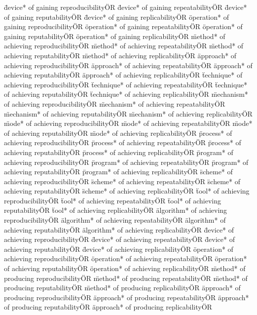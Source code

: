 \documentclass[
10pt, %
a4paper, %
oneside, %
headinclude,footinclude, %
BCOR5mm, %
]{scrartcl}
\begin{document}
\"device* of gaining reproducibility\" OR \"device* of gaining repeatability\" OR \"device* of gaining reputability\" OR \"device* of gaining replicability\" OR 
\"operation* of gaining reproducibility\" OR \"operation* of gaining repeatability\" OR \"operation* of gaining reputability\" OR \"operation* of gaining replicability\" OR 
\"method* of achieving reproducibility\" OR \"method* of achieving repeatability\" OR \"method* of achieving reputability\" OR \"method* of achieving replicability\" OR 
\"approach* of achieving reproducibility\" OR \"approach* of achieving repeatability\" OR \"approach* of achieving reputability\" OR \"approach* of achieving replicability\" OR 
\"technique* of achieving reproducibility\" OR \"technique* of achieving repeatability\" OR \"technique* of achieving reputability\" OR \"technique* of achieving replicability\" OR 
\"mechanism* of achieving reproducibility\" OR \"mechanism* of achieving repeatability\" OR \"mechanism* of achieving reputability\" OR \"mechanism* of achieving replicability\" OR 
\"mode* of achieving reproducibility\" OR \"mode* of achieving repeatability\" OR \"mode* of achieving reputability\" OR \"mode* of achieving replicability\" OR 
\"process* of achieving reproducibility\" OR \"process* of achieving repeatability\" OR \"process* of achieving reputability\" OR \"process* of achieving replicability\" OR 
\"program* of achieving reproducibility\" OR \"program* of achieving repeatability\" OR \"program* of achieving reputability\" OR \"program* of achieving replicability\" OR 
\"scheme* of achieving reproducibility\" OR \"scheme* of achieving repeatability\" OR \"scheme* of achieving reputability\" OR \"scheme* of achieving replicability\" OR 
\"tool* of achieving reproducibility\" OR \"tool* of achieving repeatability\" OR \"tool* of achieving reputability\" OR \"tool* of achieving replicability\" OR 
\"algorithm* of achieving reproducibility\" OR \"algorithm* of achieving repeatability\" OR \"algorithm* of achieving reputability\" OR \"algorithm* of achieving replicability\" OR 
\"device* of achieving reproducibility\" OR \"device* of achieving repeatability\" OR \"device* of achieving reputability\" OR \"device* of achieving replicability\" OR 
\"operation* of achieving reproducibility\" OR \"operation* of achieving repeatability\" OR \"operation* of achieving reputability\" OR \"operation* of achieving replicability\" OR 
\"method* of producing reproducibility\" OR \"method* of producing repeatability\" OR \"method* of producing reputability\" OR \"method* of producing replicability\" OR 
\"approach* of producing reproducibility\" OR \"approach* of producing repeatability\" OR \"approach* of producing reputability\" OR \"approach* of producing replicability\" OR 
\end{document}
